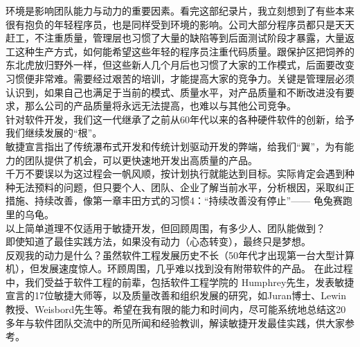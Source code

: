 
环境是影响团队能力与动力的重要因素。看完这部纪录片，我立刻想到了有些本来很有抱负的年轻程序员，也是同样受到环境的影响。公司大部分程序员都只是天天赶工，不注重质量，管理层也习惯了大量的缺陷等到后面测试阶段才暴露，大量返工这种生产方式，如何能希望这些年轻的程序员注重代码质量。跟保护区把饲养的东北虎放归野外一样，但这些新人几个月后也习惯了大家的工作模式，后面要改变习惯便非常难。需要经过艰苦的培训，才能提高大家的竞争力。关键是管理层必须认识到，如果自己也满足于当前的模式、质量水平，对产品质量和不断改进没有要求，那么公司的产品质量将永远无法提高，也难以与其他公司竞争。\\

针对软件开发，我们这一代继承了之前从60年代以来的各种硬件软件的创新，给予我们继续发展的``根''。\\
敏捷宣言指出了传统瀑布式开发和传统计划驱动开发的弊端，给我们``翼''，为有能力的团队提供了机会，可以更快速地开发出高质量的产品。\\
千万不要误以为这过程会一帆风顺，按计划执行就能达到目标。实际肯定会遇到种种无法预料的问题，但只要个人、团队、企业了解当前水平，分析根因，采取纠正措施、持续改善，像第一章丰田方式的习惯4：``持续改善没有停止''------
龟兔赛跑里的乌龟。\\
以上简单道理不仅适用于敏捷开发，但回顾周围，有多少人、团队能做到？\\
即使知道了最佳实践方法，如果没有动力（心态转变），最终只是梦想。\\
反观我的动力是什么？虽然软件工程发展历史不长（50年代才出现第一台大型计算机），但发展速度惊人。环顾周围，几乎难以找到没有附带软件的产品。
在此过程中，我们受益于软件工程的前辈，包括软件工程学院的
Humphrey先生，发表敏捷宣言的17位敏捷大师等，以及质量改善和组织发展的研究，如Juran博士、Lewin
教授、Weisbord先生等。希望在我有限的能力和时间内，尽可能系统地总结这20多年与软件团队交流中的所见所闻和经验教训，解读敏捷开发最佳实践，供大家参考。


